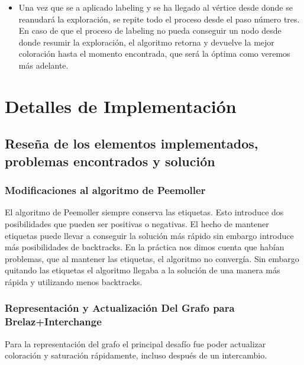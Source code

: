 \documentclass[a4paper,10pt]{article}
\begin{document}
\begin{itemize}
\begin{itemize}
	      coloreado con el color m\'as alto usado y se aplica el
	      proceso de labeling propuesto por Peemoller.
	\item Si se lleg\'o a un v\'ertice con un conjunto de colores
	      posibles vac\'io, se aplica el procedimento de labeling de
	      Peemoller directamente.
      \end{itemize}
\item Una vez que se a aplicado labeling y se ha llegado al v\'ertice
      desde donde se reanudará la exploraci\'on, se repite todo el
      proceso desde el paso n\'umero tres. En caso de que el proceso de
      labeling no pueda conseguir un nodo desde donde resumir la
      exploraci\'on, el algoritmo retorna y devuelve la mejor
      coloraci\'on hasta el momento encontrada, que ser\'a la \'optima
      como veremos m\'as adelante.
\end{itemize}
       
\newpage
\section{Detalles de Implementación}

\subsection{Reseña de los elementos implementados, problemas encontrados y solución}

\subsubsection{Modificaciones al algoritmo de Peemoller}

El algoritmo de Peemoller siempre conserva las etiquetas. Esto introduce dos 
posibilidades que pueden ser positivas o negativas. El hecho de mantener etiquetas 
puede llevar a conseguir la solución más rápido sin embargo introduce más posibilidades 
de backtracks. En la práctica nos dimos cuenta que habían problemas, que al mantener las 
etiquetas, el algoritmo no convergía. Sin embargo quitando las etiquetas el algoritmo 
llegaba a la solución de una manera más rápida y utilizando menos backtracks.

\subsubsection{Representación y Actualización Del Grafo para Brelaz+Interchange}

Para la representación del grafo el principal desafío fue poder
actualizar coloración y saturación rápidamente, incluso después de un
intercambio.
\end{document}
